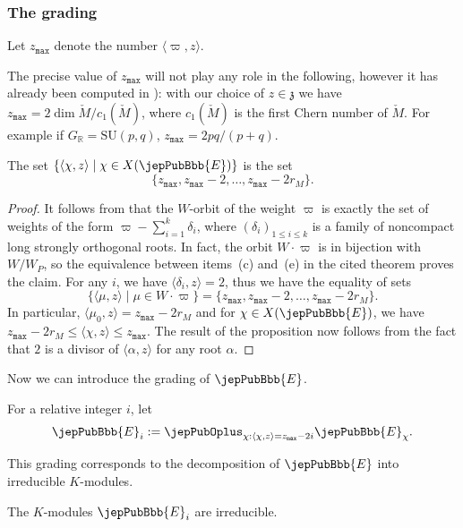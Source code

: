 \subsubsection{The grading}
\begin{notation}
Let $z_{\mathtt{max}}$ denote the number $\langle\varpi,z\rangle$.
\end{notation}
\begin{remark}
The precise value of $z_{\mathtt{max}}$ will not play any role in the following, however it has already been computed in \cite[p.~214-216]{jep93KM10}): with our choice of $z\in\mathfrak z$ we have $z_{\mathtt{max}}=2\dim\check M/c_1(\check M)$, where $c_1(\check M)$ is the first Chern number of $\check M$. For example if $G_{\mathbb R}=\mathrm{SU}(p,q)$, $z_{\mathtt{max}}=2pq/(p+q)$.
\end{remark}
\begin{proposition}
The set $\{\langle\chi,z\rangle\mid\chi\in X(\jepPubBbb{E})\}$ is the set
\[
\{z_{\mathtt{max}},z_{\mathtt{max}}-2,\ldots,z_{\mathtt{max}}-2r_M\}.
\]
\end{proposition}
\begin{proof}
It follows from \cite[Th.~2.1]{jep93RRS92} that the $W$-orbit of the weight $\varpi$ is exactly the set of weights of the form $\varpi-\sum_{i=1}^k\delta_i$, where $(\delta_i)_{1\leqslant i\leqslant k}$ is a family of noncompact long strongly orthogonal roots. In fact, the orbit $W\cdot\varpi$ is in bijection with $W/W_P$, so the equivalence between items~(c) and~(e) in the cited theorem proves the claim. For any $i$, we have $\langle\delta_i,z\rangle=2$, thus we have the equality of sets
\[
\{\langle\mu,z\rangle\mid\mu\in W\cdot\varpi\}=\{z_{\mathtt{max}},z_{\mathtt{max}}-2,\ldots,z_{\mathtt{max}}-2r_M\}.
\]
In particular, $\langle\mu_0,z\rangle=z_{\mathtt{max}}-2r_M$ and for $\chi\in X(\jepPubBbb{E})$, we have $z_{\mathtt{max}}-2r_M\leqslant\langle\chi,z\rangle\leqslant z_{\mathtt{max}}$. The result of the proposition now follows from the fact that $2$ is a divisor of $\langle\alpha,z\rangle$ for any root $\alpha$.
\end{proof}
Now we can introduce the grading of $\jepPubBbb{E}$.
\begin{definition}
For a relative integer $i$, let
\[
\jepPubBbb{E}_i:=\jepPubOplus_{\chi:\langle\chi,z\rangle=z_{\mathtt{max}}-2i}\jepPubBbb{E}_\chi.
\]
\end{definition}
This grading corresponds to the decomposition of $\jepPubBbb{E}$ into irreducible $K$-modules.
\begin{proposition}
The $K$-modules $\jepPubBbb{E}_i$ are irreducible.
\end{proposition}
